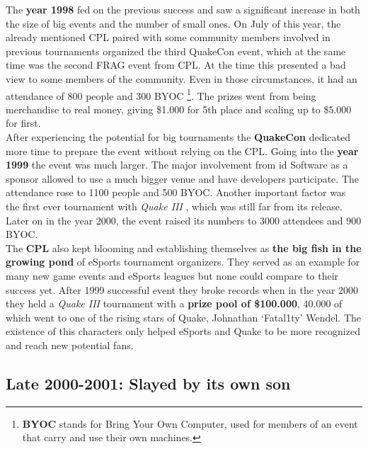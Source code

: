The \textbf{year 1998} fed on the previous success and saw a significant increase in both the size of big events and the number of small ones. On July of this year, the already mentioned CPL paired with some community members involved in previous tournaments organized the third QuakeCon event, which at the same time was the second FRAG event from CPL. At the time this presented a bad view to some members of the community. Even in those circumstances, it had an attendance of 800 people and 300 BYOC \footnote{\textbf{BYOC} stands for Bring Your Own Computer, used for members of an event that carry and use their own machines.}. The prizes went from being merchandise to real money, giving \$1.000 for 5th place and scaling up to \$5.000 for first.\\

After experiencing the potential for big tournaments the \textbf{QuakeCon} dedicated more time to prepare the event without relying on the CPL. Going into the \textbf{year 1999} the event was much larger. The major involvement from id Software as a sponsor allowed to use a much bigger venue and have developers participate. The attendance rose to 1100 people and 500 BYOC. Another important factor was the first ever tournament with \textit{Quake III} \citep{game:quake3}, which was still far from its release.\\ Later on in the year 2000, the event raised its numbers to 3000 attendees and 900 BYOC.\\

The \textbf{CPL} also kept blooming and establishing themselves as \textbf{the big fish in the growing pond} of eSports tournament organizers. They served as an example for many new game events and eSports leagues but none could compare to their success yet. After 1999 successful event they broke records when in the year 2000 they held a \textit{Quake III} tournament with a \textbf{prize pool of \$100.000}, 40.000 of which went to one of the rising stars of Quake, Johnathan ‘Fatal1ty’ Wendel. The existence of this characters only helped eSports and Quake to be more recognized and reach new potential fans.


\subsection{Late 2000-2001: Slayed by its own son}



